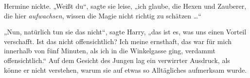 Hermine nickte.
„Weißt du“, sagte sie leise, „ich glaube, die Hexen und Zauberer, die hier \emph{aufwachsen}, wissen die Magie nicht richtig zu schätzen …“

„Nun, natürlich tun sie das nicht“, sagte Harry, „das ist es, was uns einen Vorteil verschafft. Ist das nicht offensichtlich? Ich meine ernsthaft, das war für mich innerhalb von fünf Minuten, als ich in die Winkelgasse ging, verdammt offensichtlich.“ Auf dem Gesicht des Jungen lag ein verwirrter Ausdruck, als könne er nicht verstehen, warum sie auf etwas so Alltägliches aufmerksam wurde.

